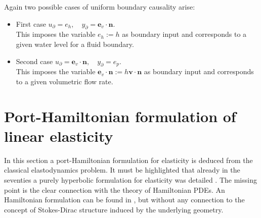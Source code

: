 Again two possible cases of uniform boundary causality arise:
\begin{itemize}
	\item {First case} ${u}_\partial = e_h, \quad {y}_\partial = \bm{e}_v \cdot\bm{n}$. \\
	This imposes the variable $e_h:= h$ as boundary input and corresponds to a given water level for a fluid boundary.
	
	\item {Second case} ${u}_\partial = \bm{e}_v \cdot\bm{n}, \quad {y}_\partial = e_p$. \\
	This imposes the variable $\bm{e}_v \cdot\bm{n}:= h \bm{v} \cdot \bm{n}$ as boundary input and corresponds to a given volumetric flow rate.
\end{itemize} 

\section{Port-Hamiltonian formulation of linear elasticity}\label{sec:pHelas}

In this section a port-Hamiltonian formulation for elasticity is deduced from the classical elastodynamics problem. It must be highlighted that already in the seventies a purely hyperbolic formulation for elasticity was detailed \cite{hughes1978classical}. The missing point is the clear connection with the theory of Hamiltonian PDEs. An Hamiltonian formulation can be found in \cite[Chapter 16]{grinfield2015}, but without any connection to the concept of Stokes-Dirac structure induced by the underlying geometry. \\


